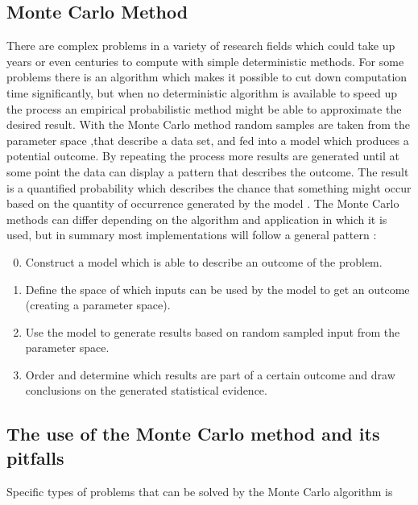 \subsection{Monte Carlo Method}
There are complex problems in a variety of research fields which could take up years or even centuries to compute with simple deterministic methods. For some problems there is an algorithm which makes it possible to cut down computation time significantly, but when no deterministic algorithm is available to speed up the process an empirical probabilistic method might be able to approximate the desired result. With the Monte Carlo method random samples are taken from the parameter space ,that describe a data set, and fed into a model which produces a potential outcome. By repeating the process more results are generated until at some point the data can display a pattern that describes the outcome. The result is a quantified probability which describes the chance that something might occur based on the quantity of occurrence generated by the model \cite{}.
\newline
\newline
The Monte Carlo methods can differ depending on the algorithm and application in which it is used, but in summary most implementations will follow a general pattern \cite{}:
\begin{enumerate}
	\setcounter{enumi}{-1}
	\item Construct a model which is able to describe an outcome of the problem.
	\item Define the space of which inputs can be used by the model to get an outcome (creating a parameter space). 
	\item Use the model to generate results based on random sampled input from the parameter space.
	\item Order and determine which results are part of a certain outcome and draw conclusions on the generated statistical evidence.
\end{enumerate}

\label{subsec:Monte_Carlo_Method}

\subsection{The use of the Monte Carlo method and its pitfalls}
Specific types of problems that can be solved by the Monte Carlo algorithm is

